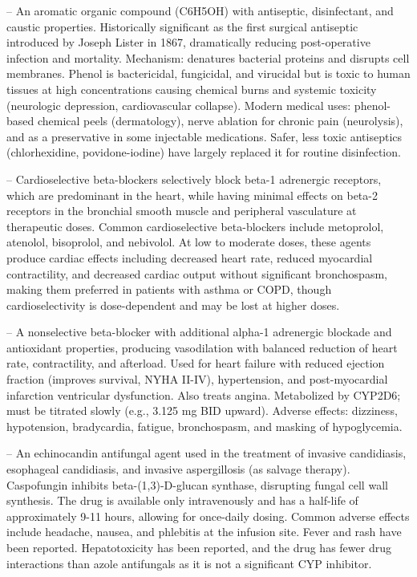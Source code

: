 -- An aromatic organic compound (C6H5OH) with antiseptic, disinfectant, and caustic properties. Historically significant as the first surgical antiseptic introduced by Joseph Lister in 1867, dramatically reducing post-operative infection and mortality. Mechanism: denatures bacterial proteins and disrupts cell membranes. Phenol is bactericidal, fungicidal, and virucidal but is toxic to human tissues at high concentrations causing chemical burns and systemic toxicity (neurologic depression, cardiovascular collapse). Modern medical uses: phenol-based chemical peels (dermatology), nerve ablation for chronic pain (neurolysis), and as a preservative in some injectable medications. Safer, less toxic antiseptics (chlorhexidine, povidone-iodine) have largely replaced it for routine disinfection.

-- Cardioselective beta-blockers selectively block beta-1 adrenergic receptors, which are predominant in the heart, while having minimal effects on beta-2 receptors in the bronchial smooth muscle and peripheral vasculature at therapeutic doses. Common cardioselective beta-blockers include metoprolol, atenolol, bisoprolol, and nebivolol. At low to moderate doses, these agents produce cardiac effects including decreased heart rate, reduced myocardial contractility, and decreased cardiac output without significant bronchospasm, making them preferred in patients with asthma or COPD, though cardioselectivity is dose-dependent and may be lost at higher doses.

-- A nonselective beta-blocker with additional alpha-1 adrenergic blockade and antioxidant properties, producing vasodilation with balanced reduction of heart rate, contractility, and afterload. Used for heart failure with reduced ejection fraction (improves survival, NYHA II-IV), hypertension, and post-myocardial infarction ventricular dysfunction. Also treats angina. Metabolized by CYP2D6; must be titrated slowly (e.g., 3.125 mg BID upward). Adverse effects: dizziness, hypotension, bradycardia, fatigue, bronchospasm, and masking of hypoglycemia.

-- An echinocandin antifungal agent used in the treatment of invasive candidiasis, esophageal candidiasis, and invasive aspergillosis (as salvage therapy). Caspofungin inhibits beta-(1,3)-D-glucan synthase, disrupting fungal cell wall synthesis. The drug is available only intravenously and has a half-life of approximately 9-11 hours, allowing for once-daily dosing. Common adverse effects include headache, nausea, and phlebitis at the infusion site. Fever and rash have been reported. Hepatotoxicity has been reported, and the drug has fewer drug interactions than azole antifungals as it is not a significant CYP inhibitor.


